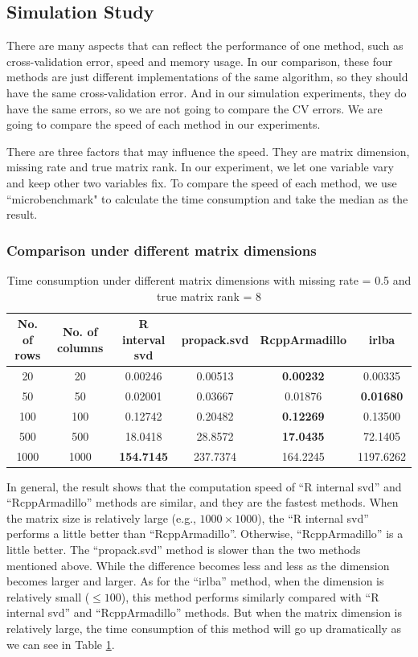 \documentclass[12pt]{article}
\begin{document}
	\subsection{Simulation Study}
	
	There are many aspects that can reflect the performance of one method, such as cross-validation error, speed and memory usage. In our comparison, these four methods are just different implementations of the same algorithm, so they should have the same cross-validation error. And in our simulation experiments, they do have the same errors, so we are not going to compare the CV errors. We are going to compare the speed of each method in our experiments.
	
	There are three factors that may influence the speed. They are matrix dimension, missing rate and true matrix rank. In our experiment, we let one variable vary and keep other two variables fix. To compare the speed of each method, we use ``microbenchmark" to calculate the time consumption and take the median as the result.
	
	\subsubsection{Comparison under different matrix dimensions}
	
\begin{table}[ht]
	\centering
	\caption{Time consumption under different matrix dimensions with missing rate = 0.5 and true matrix rank = 8 }\label{dimension}
	\begin{tabular}{cccccc}
		\hline\hline
	No. of rows & No. of columns & R interval svd & propack.svd & RcppArmadillo & irlba\\
	\hline
	20&20&0.00246&0.00513&\textbf{0.00232}&0.00335\\
	50&50&0.02001&0.03667&0.01876&\textbf{0.01680}\\
	100&100&0.12742&0.20482&\textbf{0.12269}&0.13500\\
	500&500&18.0418&28.8572&\textbf{17.0435}&72.1405\\
	1000&1000&\textbf{154.7145}&237.7374&164.2245&1197.6262\\
		\hline\hline
	\end{tabular}
\end{table}

In general, the result shows that the computation speed of “R internal svd” and “RcppArmadillo” methods are similar, and they are the fastest methods. When the matrix size is relatively large (e.g., $1000\times1000$), the “R internal svd” performs a little better than “RcppArmadillo”. Otherwise, “RcppArmadillo” is a little better. The “propack.svd” method is slower than the two methods mentioned above.  While the difference  becomes less and less as the dimension becomes larger and larger. As for the “irlba” method, when the dimension is relatively small ($\leq 100$), this method performs similarly compared with “R internal svd” and “RcppArmadillo” methods. But when the matrix dimension is relatively large, the time consumption of this method will go up dramatically as we can see in Table \ref{dimension}.
\end{document}
